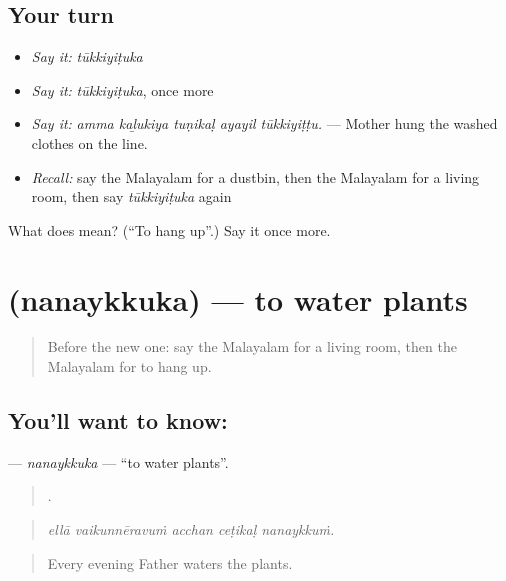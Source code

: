 \subsection*{Your turn}
\begin{itemize}
\raggedright
  \item \emph{Say it:} \emph{tūkkiyiṭuka}
  \item \emph{Say it:} \emph{tūkkiyiṭuka}, once more
  \item \emph{Say it:} \emph{amma kaḻukiya tuṇikaḷ ayayil tūkkiyiṭṭu.} — Mother hung the washed clothes on the line.
  \item \emph{Recall:} say the Malayalam for a dustbin, then the Malayalam for a living room, then say \emph{tūkkiyiṭuka} again
\end{itemize}

\begin{tcolorbox}[breakable,colback=teal!4,colframe=teal!35!black,title={Before you move on}]
What does  mean? (\textquotedblleft{}To hang up\textquotedblright{}.) Say it once more.
\end{tcolorbox}
\section[\texorpdfstring{\ml{നനയ്ക്കുക} (nanaykkuka)}{നനയ്ക്കുക (nanaykkuka)}]{ (nanaykkuka) — to water plants}

\label{lesson:ML-C571-nanaykkuka}



\begin{quote}
Before the new one: say the Malayalam for a living room, then the Malayalam for to hang up.
\end{quote}

\subsection*{You'll want to know: }
\textbf{} — \emph{nanaykkuka} — \textquotedblleft{}to water plants\textquotedblright{}.

\begin{quote}
    .
\end{quote}

\begin{quote}
\emph{ellā vaikunnēravuṁ acchan ceṭikaḷ nanaykkuṁ.}
\end{quote}

\begin{quote}
Every evening Father waters the plants.
\end{quote}

